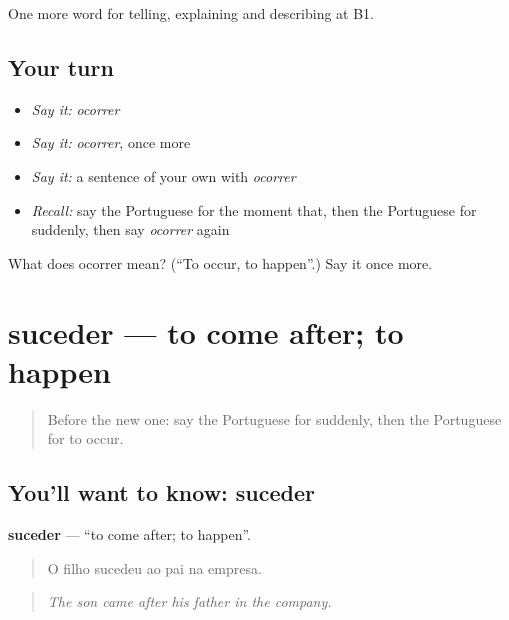 \begin{grammarlens}[title={What you've built}]
One more word for telling, explaining and describing at B1.
\end{grammarlens}

\subsection*{Your turn}
\begin{itemize}
\raggedright
  \item \emph{Say it:} \emph{ocorrer}
  \item \emph{Say it:} \emph{ocorrer}, once more
  \item \emph{Say it:} a sentence of your own with \emph{ocorrer}
  \item \emph{Recall:} say the Portuguese for the moment that, then the Portuguese for suddenly, then say \emph{ocorrer} again
\end{itemize}

\begin{tcolorbox}[breakable,colback=teal!4,colframe=teal!35!black,title={Before you move on}]
What does ocorrer mean? (\textquotedblleft{}To occur, to happen\textquotedblright{}.) Say it once more.
\end{tcolorbox}
\section[suceder]{suceder — to come after; to happen}

\label{lesson:PT-C271-suceder}



\begin{quote}
Before the new one: say the Portuguese for suddenly, then the Portuguese for to occur.
\end{quote}

\subsection*{You'll want to know: suceder}
\textbf{suceder} — \textquotedblleft{}to come after; to happen\textquotedblright{}.

\begin{quote}
O filho sucedeu ao pai na empresa.
\end{quote}

\begin{quote}
\emph{The son came after his father in the company.}
\end{quote}

